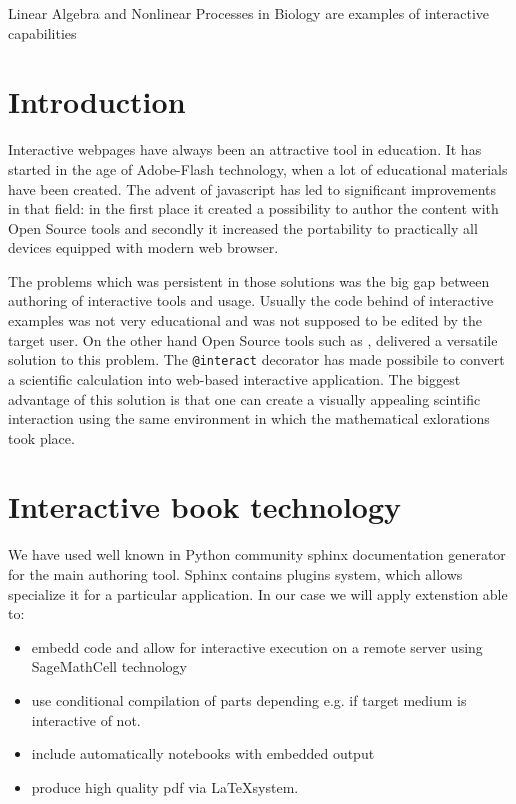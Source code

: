 \documentclass{deliverablereport}
\author{Marcin Kostur, Jerzy Łuczka, Jan Aksamit, Jolanta Marzec}
\begin{document}
\maketitle

Linear Algebra and Nonlinear Processes in Biology are examples of
interactive capabilities


\section{Introduction}

Interactive webpages have always been an attractive tool in
education. It has started in the age of Adobe-Flash technology, when a
lot of educational materials have been created. The advent of
javascript has led to significant improvements in that field: in the
first place it created a possibility to author the content with Open
Source tools and secondly it increased the portability to practically
all devices equipped with modern web browser.

The problems which was persistent in those solutions was the big gap
between authoring of interactive tools and usage. Usually the code
behind of interactive examples was not very educational and was not
supposed to be edited by the target user. On the other hand Open
Source tools such as \Sage, delivered a versatile solution to this
problem.  The \texttt{@interact} decorator has made possibile to
convert a scientific calculation into web-based interactive
application. The biggest advantage of this solution is that one can
create a visually appealing scintific interaction using the same
environment in which the mathematical exlorations took place.


\section{Interactive book technology}

We have used well known in Python community sphinx documentation
generator for the main authoring tool. Sphinx contains plugins system,
which allows specialize it for a particular application. In our case
we will apply extenstion able to: 

\begin{itemize}
\item embedd \Sage code and allow for interactive execution on a
  remote server using SageMathCell  technology
\item use conditional compilation of parts depending e.g. if target medium is interactive of not.
\item include automatically \Jupyter notebooks with embedded output
\item  produce high quality  pdf via \LaTeX system.
\end{itemize}  
\end{document}
